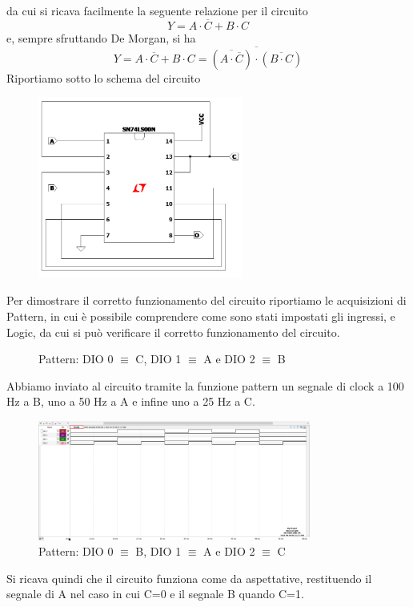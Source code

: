 \documentclass[10pt, a4paper, italian]{article}
\begin{document}
da cui si ricava facilmente la seguente relazione per il circuito
\[
Y=A\cdot\overline{C}+B\cdot C
\]
e, sempre sfruttando De Morgan, si ha
\[
Y=A\cdot\overline{C}+B\cdot C=\overline{(\overline{A\cdot\overline{C}})\cdot(\overline{B\cdot C})}
\]
Riportiamo sotto lo schema del circuito
\begin{figure}[htbp]
    \centering
    \includegraphics[width=0.6\textwidth]{NAND_MP.png}
    \label{circuito2}
\end{figure}

Per dimostrare il corretto funzionamento del circuito riportiamo le acquisizioni di Pattern, in cui è possibile comprendere come sono stati impostati gli ingressi, e Logic, da cui si può verificare il corretto funzionamento del circuito.
\begin{figure}[htbp]
    \centering
    \caption{Pattern: DIO 0 $\equiv$ C, DIO 1 $\equiv$ A e DIO 2 $\equiv$ B}
\end{figure}
Abbiamo inviato al circuito tramite la funzione pattern un segnale di clock a 100 Hz a B, uno a 50 Hz a A e infine uno a 25 Hz a C.
\begin{figure}[htb!]
    \centering
    \includegraphics[width=0.8\textwidth]{Multiplex.png}
    \caption{Pattern: DIO 0 $\equiv$ B, DIO 1 $\equiv$ A e DIO 2 $\equiv$ C}
    \label{pat2}
\end{figure}
Si ricava quindi che il circuito funziona come da aspettative, restituendo il segnale di A nel caso in cui C=0 e il segnale B quando C=1.
\end{document}
